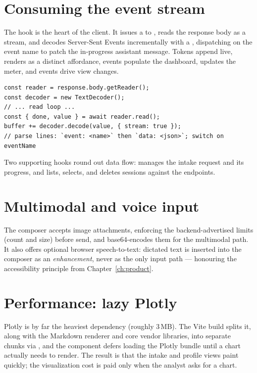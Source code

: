 \section{Consuming the event stream}
The  hook is the heart of the client. It issues a  to
, reads the response body as a stream, and decodes Server-Sent
Events incrementally with a , dispatching on the event name to
patch the in-progress assistant message. Tokens append live, 
renders as a distinct affordance,  events populate the dashboard,
 updates the meter, and  events drive view changes.

\begin{lstlisting}[style=js,caption={Incremental SSE decoding in \code{useChat}.}]
const reader = response.body.getReader();
const decoder = new TextDecoder();
// ... read loop ...
const { done, value } = await reader.read();
buffer += decoder.decode(value, { stream: true });
// parse lines: `event: <name>` then `data: <json>`; switch on eventName
\end{lstlisting}

Two supporting hooks round out data flow:  manages the
intake request and its progress, and  lists, selects, and
deletes sessions against the  endpoints.

\section{Multimodal and voice input}
The composer accepts image attachments, enforcing the backend-advertised limits
(count and size) before send, and base64-encodes them for the multimodal path.
It also offers optional browser speech-to-text: dictated text is inserted into
the composer as an \emph{enhancement}, never as the only input path --- honouring
the accessibility principle from Chapter~\ref{ch:product}.

\section{Performance: lazy Plotly}
Plotly is by far the heaviest dependency (roughly 3\,MB). The Vite build splits
it, along with the Markdown renderer and core vendor libraries, into separate
chunks via , and the  component defers
loading the Plotly bundle until a chart actually needs to render. The result is
that the intake and profile views paint quickly; the visualization cost is paid
only when the analyst asks for a chart.

